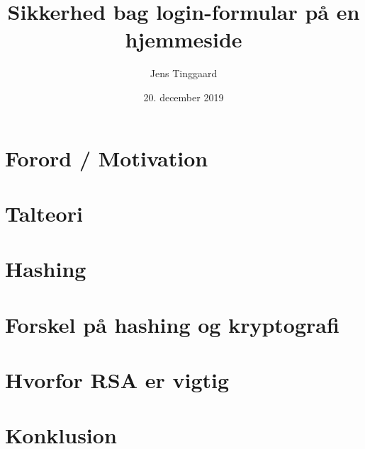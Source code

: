 \documentclass[a4paper, 12pt]{article}
\date{20. december 2019}
\title{Sikkerhed bag login-formular på en hjemmeside}
\author{Jens Tinggaard}
\theoremstyle{break}
\theoremstyle{breakline}
\numberwithin{equation}{section}
\begin{document}


\tableofcontents


\newpage
\section*{Forord / Motivation}



\newpage
\section{Talteori}



\newpage
\section{Hashing}



\newpage
\section{Forskel på hashing og kryptografi}



\newpage
\section{Hvorfor RSA er vigtig}



\newpage
\section*{Konklusion}







\newpage
\setlength\bibitemsep{10pt}
\printbibliography[
heading=bibintoc, %
title={Litteratur} %
]

\newpage
\begin{appendices}
    
\end{appendices}
\end{document}
